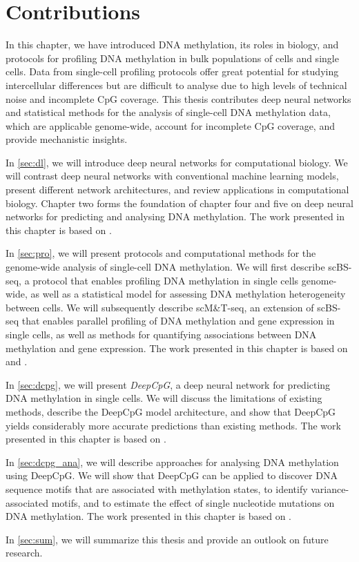\section{Contributions} \label{sec:intro_contrib}

In this chapter, we have introduced DNA methylation, its roles in biology, and protocols for profiling DNA methylation in bulk populations of cells and single cells. Data from single-cell profiling protocols offer great potential for studying intercellular differences but are difficult to analyse due to high levels of technical noise and incomplete CpG coverage. This thesis contributes deep neural networks and statistical methods for the analysis of single-cell DNA methylation data, which are applicable genome-wide, account for incomplete CpG coverage, and provide mechanistic insights.

In \cref{sec:dl}, we will introduce deep neural networks for computational biology. We will contrast deep neural networks with conventional machine learning models, present different network architectures, and review applications in computational biology. Chapter two forms the foundation of chapter four and five on deep neural networks for predicting and analysing DNA methylation. The work presented in this chapter is based on \citet{angermueller_deep_2016}.

In \cref{sec:pro}, we will present protocols and computational methods for the genome-wide analysis of single-cell DNA methylation. We will first describe scBS-seq, a protocol that enables profiling DNA methylation in single cells genome-wide, as well as a statistical model for assessing DNA methylation heterogeneity between cells. We will subsequently describe scM\&T-seq, an extension of scBS-seq that enables parallel profiling of DNA methylation and gene expression in single cells, as well as methods for quantifying associations between DNA methylation and gene expression. The work presented in this chapter is based on \citet{smallwood_single-cell_2014} and \citet{angermueller_parallel_2016}.

In \cref{sec:dcpg}, we will present \emph{DeepCpG}, a deep neural network for predicting DNA methylation in single cells. We will discuss the limitations of existing methods, describe the DeepCpG model architecture, and show that DeepCpG yields considerably more accurate predictions than existing methods. The work presented in this chapter is based on \citet{angermueller_accurate_2017}.

In \cref{sec:dcpg_ana}, we will describe approaches for analysing DNA methylation using DeepCpG. We will show that DeepCpG can be applied to discover DNA sequence motifs that are associated with methylation states, to identify variance-associated motifs, and to estimate the effect of single nucleotide mutations on DNA methylation. The work presented in this chapter is based on \citet{angermueller_accurate_2017}.

In \cref{sec:sum}, we will summarize this thesis and provide an outlook on future research.
